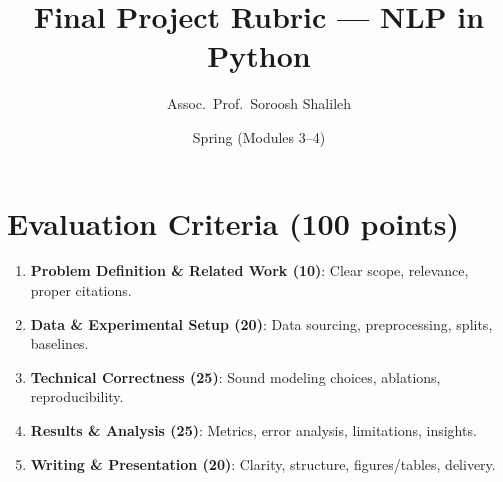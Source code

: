 \documentclass[12pt]{article}
\title{Final Project Rubric --- NLP in Python}
\author{Assoc.\ Prof.\ Soroosh Shalileh}
\date{Spring (Modules 3--4)}
\begin{document}
\maketitle
\section*{Evaluation Criteria (100 points)}
\begin{enumerate}[leftmargin=*]
  \item \textbf{Problem Definition \& Related Work (10)}: Clear scope, relevance, proper citations.
  \item \textbf{Data \& Experimental Setup (20)}: Data sourcing, preprocessing, splits, baselines.
  \item \textbf{Technical Correctness (25)}: Sound modeling choices, ablations, reproducibility.
  \item \textbf{Results \& Analysis (25)}: Metrics, error analysis, limitations, insights.
  \item \textbf{Writing \& Presentation (20)}: Clarity, structure, figures/tables, delivery.
\end{enumerate}
\end{document}
